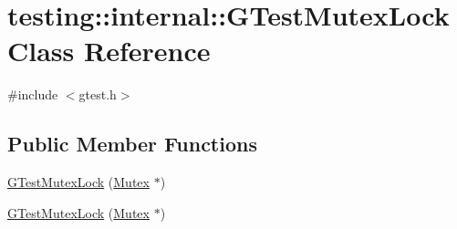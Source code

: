 \hypertarget{classtesting_1_1internal_1_1_g_test_mutex_lock}{\section{testing\-:\-:internal\-:\-:G\-Test\-Mutex\-Lock Class Reference}
\label{classtesting_1_1internal_1_1_g_test_mutex_lock}
}


{\ttfamily \#include $<$gtest.\-h$>$}

\subsection*{Public Member Functions}
\begin{DoxyCompactItemize}
\item 
\hyperlink{classtesting_1_1internal_1_1_g_test_mutex_lock_a77e3cba326d5356b4a1dea3790559c26}{G\-Test\-Mutex\-Lock} (\hyperlink{classtesting_1_1internal_1_1_mutex}{Mutex} $\ast$)
\item 
\hyperlink{classtesting_1_1internal_1_1_g_test_mutex_lock_a77e3cba326d5356b4a1dea3790559c26}{G\-Test\-Mutex\-Lock} (\hyperlink{classtesting_1_1internal_1_1_mutex}{Mutex} $\ast$)
\end{DoxyCompactItemize}


